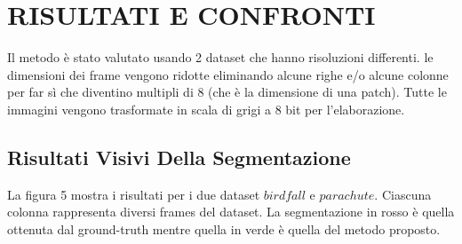 \documentclass[12pt,twocolumn]{IEEEtran}
\begin{document}
	\section{RISULTATI E CONFRONTI}
		Il metodo è stato valutato usando 2 dataset che hanno risoluzioni differenti. le dimensioni dei frame vengono ridotte eliminando alcune righe e/o alcune colonne per far sì che diventino multipli di 8 (che è la dimensione di una patch). Tutte le immagini vengono trasformate in scala di grigi a 8 bit per l'elaborazione.
		\subsection{Risultati Visivi Della Segmentazione}
			La figura 5 mostra i risultati per i due dataset $birdfall$ e $parachute$. Ciascuna colonna rappresenta diversi frames del dataset. La segmentazione in rosso è quella ottenuta dal ground-truth mentre quella in verde è quella del metodo proposto.
\end{document}
